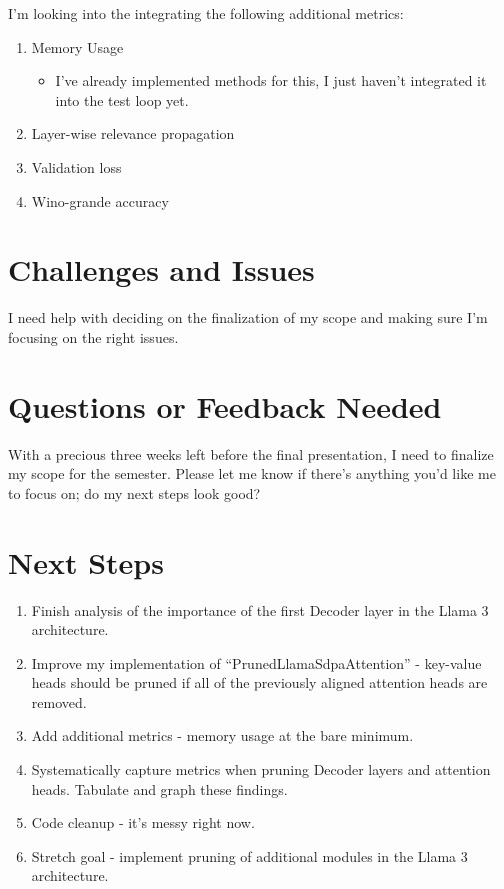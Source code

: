 \documentclass{article}
\begin{document}
    I'm looking into the integrating the following additional metrics:

    \begin{enumerate}
        \item Memory Usage
        \begin{itemize}
            \item I've already implemented methods for this, I just haven't integrated it into the test loop yet.
        \end{itemize}
        \item Layer-wise relevance propagation ~\cite{voita2019analyzingmultiheadselfattentionspecialized}
        \item Validation loss ~\cite{sreenivas2024llm}
        \item Wino-grande accuracy ~\cite{sreenivas2024llm}
    \end{enumerate}

    \section{Challenges and Issues}\label{sec:challenges-and-issues}

    I need help with deciding on the finalization of my scope and making sure I'm focusing on the right issues.

    \section{Questions or Feedback Needed}\label{sec:questions-or-feedback-needed}

    With a precious three weeks left before the final presentation, I need to finalize my scope for the semester.
    Please let me know if there's anything you'd like me to focus on; do my next steps look good?

    \section{Next Steps}\label{sec:next-steps}

    \begin{enumerate}
        \item Finish analysis of the importance of the first Decoder layer in the Llama 3 architecture.
        \item Improve my implementation of ``PrunedLlamaSdpaAttention'' - key-value heads should be pruned if all of the previously aligned attention heads are removed.
        \item Add additional metrics - memory usage at the bare minimum.
        \item Systematically capture metrics when pruning Decoder layers and attention heads.
        Tabulate and graph these findings.
        \item Code cleanup - it's messy right now.
        \item Stretch goal - implement pruning of additional modules in the Llama 3 architecture.
    \end{enumerate}
\end{document}
